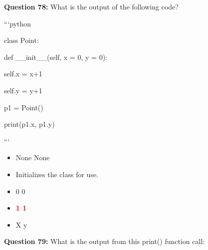 \documentclass[12pt,a4paper]{article}
\begin{document}
\vspace{0.5cm}

\textbf{Question 78:} What is the output of the following code?\newline

\newline
\newline

\newline
```python\newline

\newline
class Point:\newline

\newline
    def __init__(self, x = 0, y = 0):\newline

\newline
        self.x = x+1\newline

\newline
        self.y = y+1\newline

\newline
\newline

\newline
p1 = Point()\newline

\newline
print(p1.x, p1.y)\newline

\newline
```

\begin{itemize}
    \item[\textbf{A.}] None None
    \item[\textbf{B.}] Initializes the class for use.
    \item[\textbf{C.}] 0 0
    \item[\textbf{D.}] \textcolor{red}{\textbf{1 1}}
    \item[\textbf{E.}] X y
\end{itemize}

\vspace{0.5cm}

\textbf{Question 79:} What is the output from this print() function call:\newline

\newline
\newline
\end{document}
